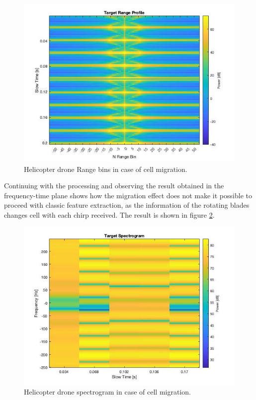 \begin{figure}[h!]
\centering
\includegraphics[width=12cm]{FMCW mD analysis-chap4/img/helic_rangebins_migr_example.jpg}
\caption{Helicopter drone Range bins in case of cell migration.}
\label{helirangemigrbins}
\end{figure}

Continuing with the processing and observing the result obtained in the frequency-time plane shows how the migration effect does not make it possible to proceed with classic feature extraction, as the information of the rotating blades changes cell with each chirp received. The result is shown in figure \ref{helirangemigrspect}.

\begin{figure}[h!]
\centering
\includegraphics[width=12cm]{FMCW mD analysis-chap4/img/helic_spect_migr_example.jpg}
\caption{Helicopter drone spectrogram in case of cell migration.}
\label{helirangemigrspect}
\end{figure}

